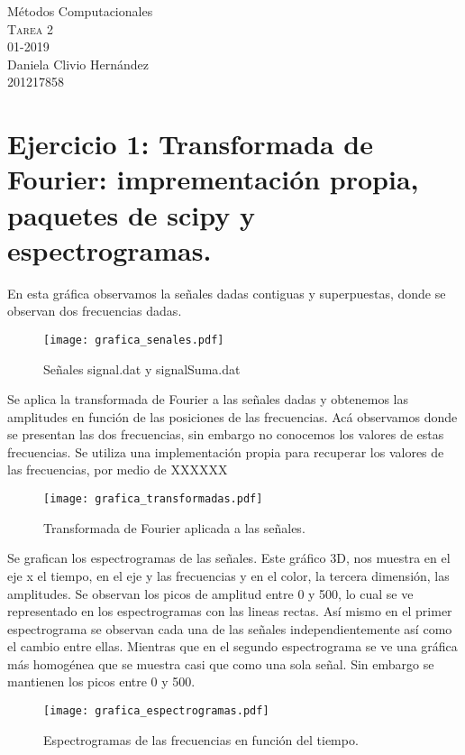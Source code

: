 \documentclass[11pt,letterpaper]{exam}
\begin{document}
\begin{center}
{\Large Métodos Computacionales} \\
\textsc{Tarea 2}\\
01-2019\\
Daniela Clivio Hernández\\
201217858\\
\end{center}

\noindent
\section{Ejercicio 1: Transformada de Fourier: imprementación propia, paquetes de scipy y espectrogramas.}
En esta gráfica observamos la señales dadas contiguas y superpuestas, donde se observan dos frecuencias dadas.\
\begin{figure}[H]
\centering
\texttt{[image: grafica\_senales.pdf]}
\caption{Señales signal.dat y signalSuma.dat}
\label{fig1}
\end{figure}

Se aplica la transformada de Fourier a las señales dadas y obtenemos las amplitudes en función de las posiciones de las frecuencias. Acá observamos donde se presentan las dos frecuencias, sin embargo no conocemos los valores de estas frecuencias. Se utiliza una implementación propia para recuperar los valores de las frecuencias, por medio de XXXXXX \\
\begin{figure}[H]
\centering
\texttt{[image: grafica\_transformadas.pdf]}
\caption{Transformada de Fourier aplicada a las señales.}
\label{fig2}
\end{figure}

Se grafican los espectrogramas de las señales. Este gráfico 3D, nos muestra en el eje x el tiempo, en el eje y las frecuencias y en el color, la tercera dimensión, las amplitudes. Se observan los picos de amplitud entre 0 y 500, lo cual se ve representado en los espectrogramas con las lineas rectas. Así mismo en el primer espectrograma se observan cada una de las señales independientemente así como el cambio entre ellas. Mientras que en el segundo espectrograma se ve una gráfica más homogénea que se muestra casi que como una sola señal. Sin embargo se mantienen los picos entre 0 y 500. \\
\begin{figure}[H]
\centering
\texttt{[image: grafica\_espectrogramas.pdf]}
\caption{Espectrogramas de las frecuencias en función del tiempo.}
\label{fig3}
\end{figure}
\end{document}
